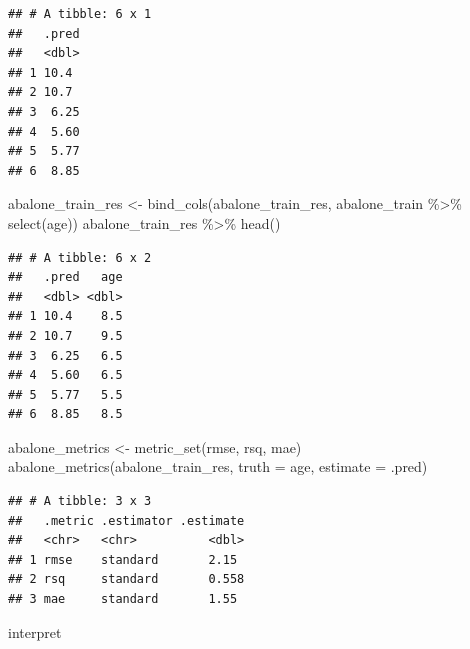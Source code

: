 \documentclass[
]{article}
\newenvironment{Shaded}{\begin{snugshade}}{\end{snugshade}}
\newcommand{\AttributeTok}[1]{\textcolor[rgb]{0.77,0.63,0.00}{#1}}
\newcommand{\FunctionTok}[1]{\textcolor[rgb]{0.00,0.00,0.00}{#1}}
\newcommand{\NormalTok}[1]{#1}
\newcommand{\OtherTok}[1]{\textcolor[rgb]{0.56,0.35,0.01}{#1}}
\newcommand{\SpecialCharTok}[1]{\textcolor[rgb]{0.00,0.00,0.00}{#1}}
\begin{document}
\begin{verbatim}
## # A tibble: 6 x 1
##   .pred
##   <dbl>
## 1 10.4 
## 2 10.7 
## 3  6.25
## 4  5.60
## 5  5.77
## 6  8.85
\end{verbatim}

\begin{Shaded}
\begin{Highlighting}[]
\NormalTok{abalone\_train\_res }\OtherTok{\textless{}{-}} \FunctionTok{bind\_cols}\NormalTok{(abalone\_train\_res, abalone\_train }\SpecialCharTok{\%\textgreater{}\%} \FunctionTok{select}\NormalTok{(age))}
\NormalTok{abalone\_train\_res }\SpecialCharTok{\%\textgreater{}\%} 
  \FunctionTok{head}\NormalTok{()}
\end{Highlighting}
\end{Shaded}

\begin{verbatim}
## # A tibble: 6 x 2
##   .pred   age
##   <dbl> <dbl>
## 1 10.4    8.5
## 2 10.7    9.5
## 3  6.25   6.5
## 4  5.60   6.5
## 5  5.77   5.5
## 6  8.85   8.5
\end{verbatim}

\begin{Shaded}
\begin{Highlighting}[]
\NormalTok{abalone\_metrics }\OtherTok{\textless{}{-}} \FunctionTok{metric\_set}\NormalTok{(rmse, rsq, mae)}
\FunctionTok{abalone\_metrics}\NormalTok{(abalone\_train\_res, }\AttributeTok{truth =}\NormalTok{ age, }
                \AttributeTok{estimate =}\NormalTok{ .pred)}
\end{Highlighting}
\end{Shaded}

\begin{verbatim}
## # A tibble: 3 x 3
##   .metric .estimator .estimate
##   <chr>   <chr>          <dbl>
## 1 rmse    standard       2.15 
## 2 rsq     standard       0.558
## 3 mae     standard       1.55
\end{verbatim}

interpret
\end{document}
